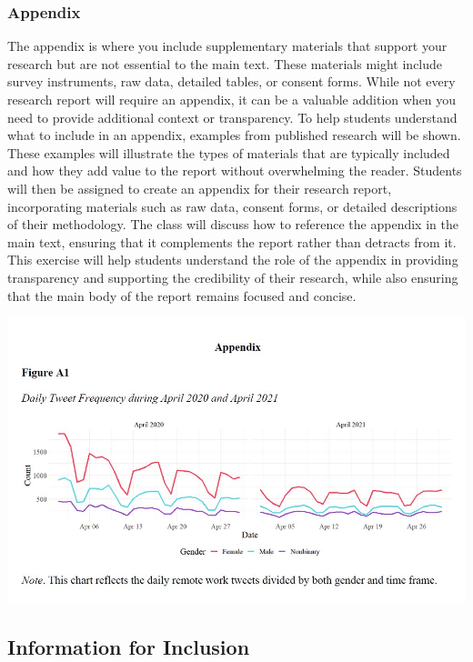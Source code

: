 \documentclass[
]{book}
\begin{document}
\subsubsection*{Appendix}\label{appendix}

The appendix is where you include supplementary materials that support your research but are not essential to the main text. These materials might include survey instruments, raw data, detailed tables, or consent forms. While not every research report will require an appendix, it can be a valuable addition when you need to provide additional context or transparency. To help students understand what to include in an appendix, examples from published research will be shown. These examples will illustrate the types of materials that are typically included and how they add value to the report without overwhelming the reader. Students will then be assigned to create an appendix for their research report, incorporating materials such as raw data, consent forms, or detailed descriptions of their methodology. The class will discuss how to reference the appendix in the main text, ensuring that it complements the report rather than detracts from it. This exercise will help students understand the role of the appendix in providing transparency and supporting the credibility of their research, while also ensuring that the main body of the report remains focused and concise.

\includegraphics[width=1\linewidth,height=\textheight,keepaspectratio]{images/fig086.jpg}

\subsection*{Information for Inclusion}\label{information-for-inclusion}
\end{document}
